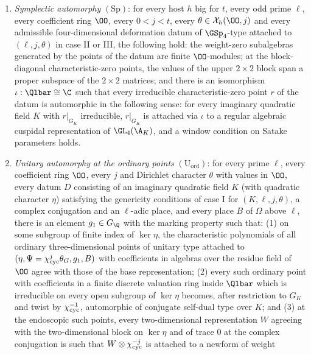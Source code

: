 \begin{definition}\label{pf:vwin-he:autstmts}
\leavevmode
\begin{enumerate}[label=(\arabic*)]
\item\label{pf:vwin-he:Sp} \emph{Symplectic automorphy} $(\mathrm{Sp})$: for every host $h$ big for $t$, every odd
prime $\ell$, every coefficient ring $\OO$, every $0<j<t$, every $\theta\in\vwinheX_h(\OO,j)$ and every admissible
four-dimensional deformation datum of $\GSp_4$-type attached to $(\ell,j,\theta)$ in case II or III, the following
hold: the weight-zero subalgebras generated by the points of the datum are finite $\OO$-modules; at the
block-diagonal characteristic-zero points, the values of the upper $2\times2$ block span a proper subspace of the
$2\times2$ matrices; and there is an isomorphism $\iota:\Qlbar\cong\C$ such that every irreducible
characteristic-zero point $r$ of the datum is automorphic in the following sense: for every imaginary quadratic field
$K$ with $r|_{G_K}$ irreducible, $r|_{G_K}$ is attached via $\iota$ to a regular algebraic cuspidal representation of
$\GL_4(\A_K)$, and a window condition on Satake parameters holds.
\item\label{pf:vwin-he:Ue} \emph{Unitary automorphy at the ordinary points} $(\mathrm{U}_{\mathrm{ord}})$: for every
prime $\ell$, every coefficient ring $\OO$, every $j$ and Dirichlet character $\theta$ with values in $\OO$, every
datum $D$ consisting of an imaginary quadratic field $K$ (with quadratic character $\eta$) satisfying the genericity
conditions of case I for $(K,\ell,j,\theta)$, a complex conjugation and an $\ell$-adic place, and every place $B$ of
$\Omega$ above $\ell$, there is an element $g_1\in G_\Q$ with the marking property such that: (1) on some subgroup of
finite index of $\ker\eta$, the characteristic polynomials of all ordinary three-dimensional points of unitary type
attached to $(\eta,\Psi=\chi_{\mathrm{cyc}}^j\theta_G,g_1,B)$ with coefficients in algebras over the residue field of $\OO$
agree with those of the base representation; (2) every such ordinary point with coefficients in a finite discrete
valuation ring inside $\Qlbar$ which is irreducible on every open subgroup of $\ker\eta$ becomes, after restriction
to $G_K$ and twist by $\chi_{\mathrm{cyc}}^{-1}$, automorphic of conjugate self-dual type over $K$; and (3) at the endoscopic
such points, every two-dimensional representation $W$ agreeing with the two-dimensional block on $\ker\eta$ and of
trace $0$ at the complex conjugation is such that $W\otimes\chi_{\mathrm{cyc}}^{-j}$ is attached to a newform of weight

\end{enumerate}
\end{definition}

